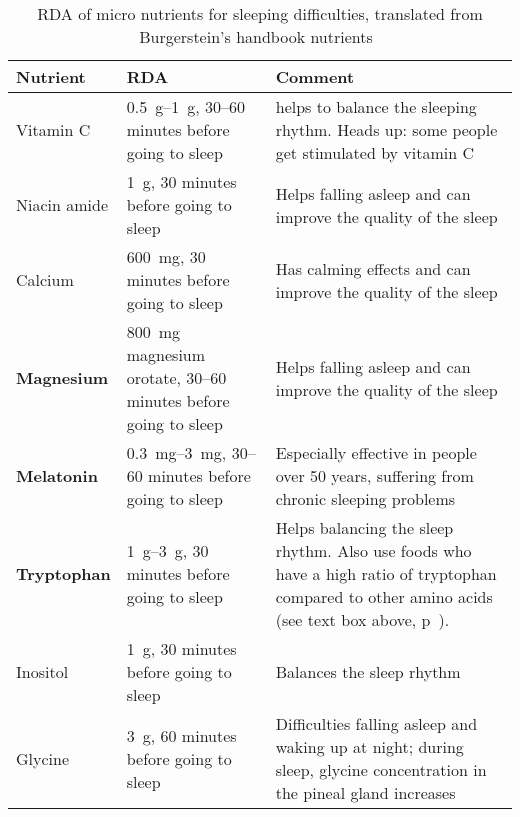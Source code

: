 \documentclass[../main.tex]{subfiles}
\begin{document}
  \begin{table}[htb!]
    \centering
    \begin{tabular}{p{2cm}p{4cm}p{5.5cm}}
      \textbf{Nutrient} &\textbf{RDA} & \textbf{Comment} \\
      \hline
      Vitamin C\index{vitamin!C} & \SIrange{0.5}{1}{\gram}, 30--60 minutes before going to sleep
                                      & helps to balance the sleeping rhythm. Heads up: some people get stimulated by vitamin C \\
      Niacin amide\index{micro nutrient!niacin amide} & \SI{1}{\gram}, 30 minutes before going to sleep & Helps falling asleep and can improve the quality of the sleep\\
      Calcium\index{micro nutrient!calcium} & \SI{600}{\milli\gram}, 30 minutes before going to sleep & Has calming effects  and can improve the quality of the sleep\\
      \textbf{Magnesium}\index{micro nutrient!magnesium}& \SI{800}{\milli\gram} magnesium orotate, 30--60 minutes before going to sleep  & Helps falling asleep and can improve the quality of the sleep\\
      \textbf{Melatonin}\index{micro nutrient!melatonin}& \SIrange{0.3}{3}{\milli\gram},
      30--60 minutes before going to sleep  & Especially effective in people over 50 years, suffering from chronic sleeping problems \\
      \textbf{Tryptophan}\index{micro nutrient!tryptophan}& \SIrange{1}{3}{\gram}, 30 minutes before going to sleep  & Helps balancing the sleep rhythm.
      Also use foods who have a high ratio of tryptophan compared to other amino acids (see text box above, p~\pageref{box:tryptophan}). \\
      Inositol\index{micro nutrient!inositol} & \SI{1}{\gram}, 30 minutes before going to sleep  & Balances the sleep rhythm \\
      Glycine\index{micro nutrient!glycine} & \SI{3}{\gram}, 60 minutes before going to sleep
      & Difficulties falling asleep and waking up at night; during sleep, glycine concentration in the pineal gland increases \\
    \end{tabular}
    \caption[RDA of micro nutrients in for sleeping difficulties]
    {RDA of micro nutrients for sleeping difficulties, translated from  Burgerstein's handbook nutrients~\cite{BurgerNutrient}}
  \end{table}
\end{document}
